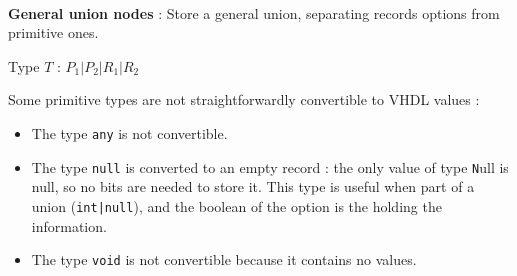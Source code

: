 \documentclass[10pt,a4paper]{article}
\newcommand{\code}{\texttt}
\begin{document}
\begin{itemize}
	\item[] 
	\begin{minipage}[b]{.95\textwidth}
		\begin{figure}
		\end{figure}
		~%
		\item \textbf{General union nodes} : Store a general union, separating records options from primitive ones.
		\begin{flushright}
			Type $T$ : $P_1|P_2|R_1|R_2$
		\end{flushright}
	\end{minipage} 
\end{itemize}


Some primitive types are not straightforwardly convertible to VHDL values :


\begin{itemize}
	\item The type \code {any} is not convertible.
	\item The type \code {null} is converted to an empty record : the only value of type \code Null is null, so no bits are needed to store it. This type is useful when part of a union (\code {int|null}), and the boolean of the option is the holding the information.
	\item The type \code {void} is not convertible because it contains no values.
\end{itemize}
\end{document}
